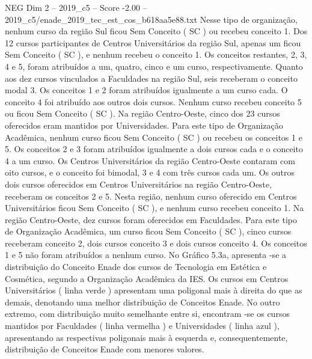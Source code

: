 \begin{textsample}{NEG Dim 2 – 2019\_c5 – Score -2.00 – 2019\_c5/enade\_2019\_tec\_est\_cos\_b618aa5e88.txt}
Nesse tipo de organização, nenhum curso da região Sul ficou Sem Conceito ( SC ) ou recebeu conceito 1.
Dos 12 cursos participantes de Centros Universitários da região Sul, apenas um ficou Sem Conceito ( SC ), e nenhum recebeu o conceito 1.
Os conceitos restantes, 2, 3, 4 e 5, foram atribuídos a um, quatro, cinco e um curso, respectivamente.
Quanto aos dez cursos vinculados a Faculdades na região Sul, seis receberam o conceito modal 3.
Os conceitos 1 e 2 foram atribuídos igualmente a um curso cada.
O conceito 4 foi atribuído aos outros dois cursos.
Nenhum curso recebeu conceito 5 ou ficou Sem Conceito ( SC ).
Na região Centro-Oeste, cinco dos 23 cursos oferecidos eram mantidos por Universidades.
Para este tipo de Organização Acadêmica, nenhum curso ficou Sem Conceito ( SC ) ou recebeu os conceitos 1 e 5.
Os conceitos 2 e 3 foram atribuídos igualmente a dois cursos cada e o conceito 4 a um curso.
Os Centros Universitários da região Centro-Oeste contaram com oito cursos, e o conceito foi bimodal, 3 e 4 com três cursos cada um.
Os outros dois cursos oferecidos em Centros Universitários na região Centro-Oeste, receberam os conceitos 2 e 5.
Nesta região, nenhum curso oferecido em Centros Universitários ficou Sem Conceito ( SC ), e nenhum curso recebeu conceito 1.
Na região Centro-Oeste, dez cursos foram oferecidos em Faculdades.
Para este tipo de Organização Acadêmica, um curso ficou Sem Conceito ( SC ), cinco cursos receberam conceito 2, dois cursos conceito 3 e dois cursos conceito 4.
Os conceitos 1 e 5 não foram atribuídos a nenhum curso.
No Gráfico 5.3a, apresenta -se a distribuição do Conceito Enade dos cursos de Tecnologia em Estética e Cosmética, segundo a Organização Acadêmica da IES.
Os cursos em Centros Universitários ( linha verde ) apresentam uma poligonal mais à direita do que as demais, denotando uma melhor distribuição de Conceitos Enade.
No outro extremo, com distribuição muito semelhante entre si, encontram -se os cursos mantidos por Faculdades ( linha vermelha ) e Universidades ( linha azul ), apresentando as respectivas poligonais mais à esquerda e, consequentemente, distribuição de Conceitos Enade com menores valores.

\end{textsample}
